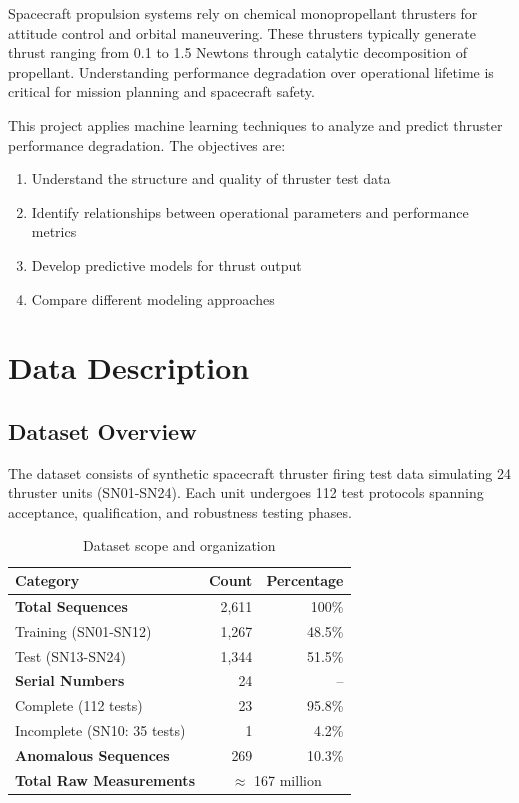\documentclass[12pt,a4paper]{article}
\begin{document}
Spacecraft propulsion systems rely on chemical monopropellant thrusters for attitude control and orbital maneuvering. These thrusters typically generate thrust ranging from 0.1 to 1.5 Newtons through catalytic decomposition of propellant. Understanding performance degradation over operational lifetime is critical for mission planning and spacecraft safety.

This project applies machine learning techniques to analyze and predict thruster performance degradation. The objectives are:

\begin{enumerate}
    \item Understand the structure and quality of thruster test data
    \item Identify relationships between operational parameters and performance metrics
    \item Develop predictive models for thrust output
    \item Compare different modeling approaches
\end{enumerate}

\section{Data Description}

\subsection{Dataset Overview}

The dataset consists of synthetic spacecraft thruster firing test data simulating 24 thruster units (SN01-SN24). Each unit undergoes 112 test protocols spanning acceptance, qualification, and robustness testing phases.

\begin{table}[H]
\centering
\caption{Dataset scope and organization}
\label{tab:dataset_scope}
\begin{tabular}{lrr}
\toprule
\textbf{Category} & \textbf{Count} & \textbf{Percentage} \\
\midrule
\textbf{Total Sequences} & 2,611 & 100\% \\
\quad Training (SN01-SN12) & 1,267 & 48.5\% \\
\quad Test (SN13-SN24) & 1,344 & 51.5\% \\
\midrule
\textbf{Serial Numbers} & 24 & -- \\
\quad Complete (112 tests) & 23 & 95.8\% \\
\quad Incomplete (SN10: 35 tests) & 1 & 4.2\% \\
\midrule
\textbf{Anomalous Sequences} & 269 & 10.3\% \\
\textbf{Total Raw Measurements} & \multicolumn{2}{c}{$\approx$ 167 million} \\
\bottomrule
\end{tabular}
\end{table}
\end{document}
